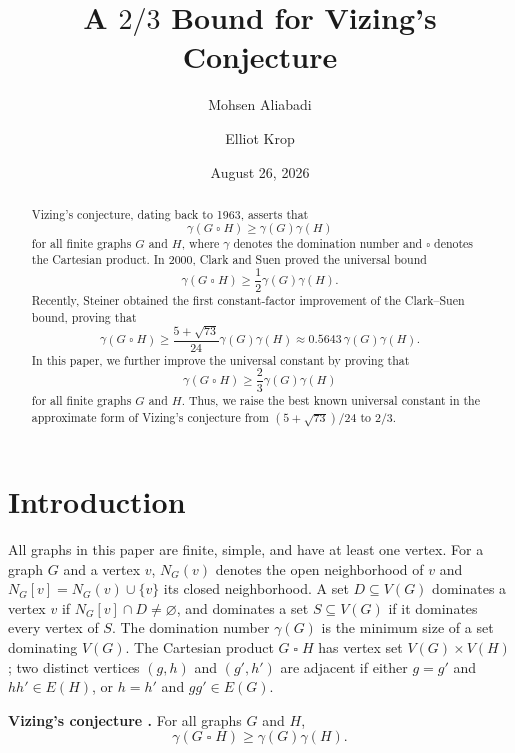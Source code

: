 \documentclass[10pt]{amsart}
\title[A $2/3$ Bound for Vizing's Conjecture]
{A $2/3$ Bound for Vizing's Conjecture}
\author{Mohsen Aliabadi}
\author{Elliot Krop}
\date{August 26, 2026}
\theoremstyle{remark}
\newcommand{\N}{N}
\newcommand{\V}{V}
\newcommand{\E}{E}
\begin{document}
\begin{abstract}
Vizing's conjecture, dating back to 1963, asserts that
\[
\gamma(G\mathbin{\square}H)
\geq
\gamma(G)\gamma(H)
\]
for all finite graphs $G$ and $H$, where $\gamma$ denotes the domination
number and $\square$ denotes the Cartesian product. In 2000, Clark and Suen
proved the universal bound
\[
\gamma(G\mathbin{\square}H)
\geq
\frac{1}{2}\gamma(G)\gamma(H).
\]
Recently, Steiner obtained the first constant-factor improvement of the
Clark--Suen bound, proving that
\[
\gamma(G\mathbin{\square}H)
\geq
\frac{5+\sqrt{73}}{24}\gamma(G)\gamma(H)
\approx
0.5643\,\gamma(G)\gamma(H).
\]
In this paper, we further improve the universal constant by proving that
\[
\gamma(G\mathbin{\square}H)
\geq
\frac{2}{3}\gamma(G)\gamma(H)
\]
for all finite graphs $G$ and $H$. Thus, we raise the best known universal
constant in the approximate form of Vizing's conjecture from
$(5+\sqrt{73})/24$ to $2/3$.
\end{abstract}

\maketitle


\maketitle

\section{Introduction}

All graphs in this paper are finite, simple, and have at least one vertex.
For a graph $G$ and a vertex $v$, $\N_G(v)$ denotes the open neighborhood of
$v$ and $\N_G[v]=\N_G(v)\cup\{v\}$ its closed neighborhood. A set
$D\subseteq \V(G)$ dominates a vertex $v$ if $\N_G[v]\cap D\neq\varnothing$,
and dominates a set $S\subseteq \V(G)$ if it dominates every vertex of $S$.
The domination number $\gamma(G)$ is the minimum size of a set dominating
$\V(G)$. The Cartesian product $G\mathbin{\square}H$ has vertex set
$\V(G)\times\V(H)$; two distinct vertices $(g,h)$ and $(g',h')$ are adjacent
if either $g=g'$ and $hh'\in\E(H)$, or $h=h'$ and $gg'\in\E(G)$.

\medskip
\noindent\textbf{Vizing's conjecture \cite{Vizing1963,Vizing1968}.}
For all graphs $G$ and $H$,
\[
 \gamma(G\mathbin{\square}H)\geq \gamma(G)\gamma(H).
\]
\end{document}
